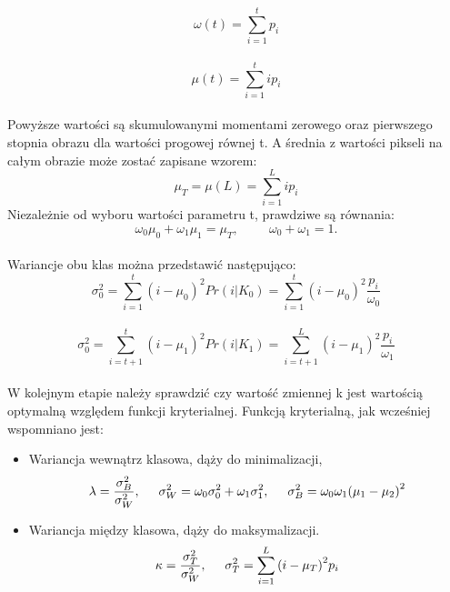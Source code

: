 \documentclass[eng,oneside]{mgr}
\begin{document}
\begin{equation}
\omega(t)=\sum_{i=1}^t p_i
\end{equation}
\
\begin{equation}
\mu(t)=\sum_{i=1}^t ip_i
\end{equation}
\\
Powyższe wartości są skumulowanymi momentami zerowego oraz pierwszego stopnia obrazu dla wartości progowej równej t. A średnia z wartości pikseli na całym obrazie może zostać zapisane wzorem:
\\
\begin{equation}
\mu_T = \mu(L) = \sum_{i=1}^L ip_i
\end{equation}
Niezależnie od wyboru wartości parametru t, prawdziwe są równania:
\\
\begin{equation}
\omega_0\mu_0+\omega_1\mu_1=\mu_T, \hspace{1cm} \omega_0+\omega_1=1. 
\end{equation}
\\
Wariancje obu klas można przedstawić następująco:
\\
\begin{equation}
\sigma_0^{2}=\sum_{i=1}^t {(i-\mu_0)}^2 Pr(i|K_0)=\sum_{i=1}^t {(i-\mu_0)}^2 \frac{p_i}{\omega_0}
\end{equation}
\
\begin{equation}
\sigma_0^{2}=\sum_{i=t+1}^t {(i-\mu_1)}^2 Pr(i|K_1)=\sum_{i=t+1}^L {(i-\mu_1)}^2 \frac{p_i}{\omega_1}
\end{equation}
\\
W kolejnym etapie należy sprawdzić czy wartość zmiennej k jest wartością optymalną względem funkcji kryterialnej. Funkcją kryterialną, jak wcześniej wspomniano jest:
\begin{itemize}
\item Wariancja wewnątrz klasowa, dąży do minimalizacji,
\begin{equation}
\lambda=\frac{\sigma_B^2}{\sigma_W^2}, \hspace{0.5cm} \sigma_W^2 = \omega_0\sigma_0^2 + \omega_1\sigma_1^2, \hspace{0.5cm} \sigma_B^2 = \omega_0\omega_1{(\mu_1-\mu_2)}^2 
\end{equation}
\item Wariancja między klasowa, dąży do maksymalizacji.
\begin{equation}
\kappa=\frac{\sigma_T^2}{\sigma_W^2}, \hspace{0.5cm} \sigma_T^2 = \sum_{i=1}^L {(i-\mu_T)}^2 p_i 
\end{equation}
\end{itemize}
\end{document}
